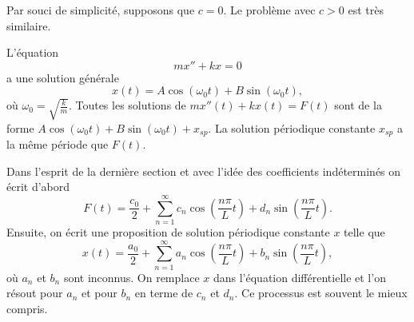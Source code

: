 Par souci de simplicité, supposons que $ c = 0 $. Le problème avec $ c> 0 $ est très
similaire.

L'équation
\begin{equation*}
mx'' + kx = 0 
\end{equation*}
a une solution générale
\begin{equation*}
x(t) = A \cos (\omega_0 t) + 
B \sin (\omega_0 t) ,
\end{equation*}
où $\omega_0 = \sqrt{\frac{k}{m}}$.
Toutes les solutions de
$mx''(t) + kx(t) = F(t)$ sont de la forme
$A \cos (\omega_0 t) + B \sin (\omega_0 t) + x_{sp}$.
La solution périodique constante $x_{sp}$ a la même période que  $F(t)$.

Dans l'esprit de la dernière section et avec l'idée des coefficients indéterminés
on écrit d'abord
\begin{equation*}
F(t) = \frac{c_0}{2} + \sum_{n=1}^\infty
c_n \cos \left( \frac{n \pi}{L} t \right) +
d_n \sin \left( \frac{n \pi}{L} t \right) .
\end{equation*}
Ensuite, on écrit une proposition de solution périodique constante $x$ telle que
\begin{equation*}
x(t) = \frac{a_0}{2} + \sum_{n=1}^\infty
a_n \cos \left( \frac{n \pi}{L} t \right) +
b_n \sin \left( \frac{n \pi}{L} t \right) ,
\end{equation*}
où $a_n$ et $b_n$ sont inconnus.
On remplace $x$ dans l'équation différentielle et l'on résout pour $a_n$ et pour
$b_n$ en terme de $c_n$ et $d_n$.  Ce processus
est souvent le mieux compris.
\pagebreak[2]

